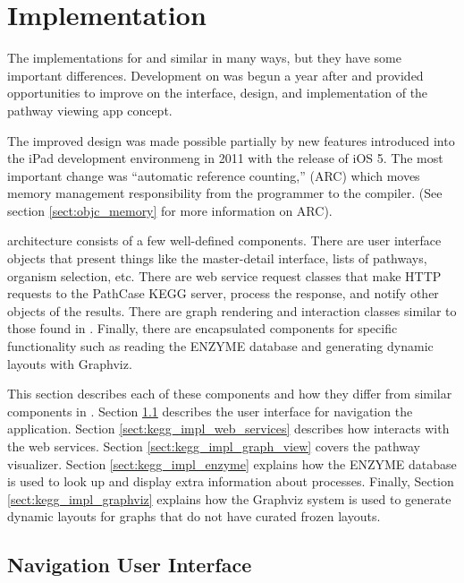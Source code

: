 \section{Implementation}
\label{sect:kegg_implementation}

The implementations for \mawapp and \keggapp similar in many ways, but they have
some important differences. Development on \keggapp was begun a year after
\mawapp and provided opportunities to improve on the interface, design, and
implementation of the pathway viewing app concept.

The improved design was made possible partially by new features introduced into
the iPad development environmeng in 2011 with the release of iOS 5. The most
important change was ``automatic reference counting,'' (ARC) which moves memory
management responsibility from the programmer to the compiler. (See section
\ref{sect:objc_memory} for more information on ARC).

\keggappp architecture consists of a few well-defined components. There are user
interface objects that present things like the master-detail interface, lists of
pathways, organism selection, etc. There are web service request classes that
make HTTP requests to the PathCase KEGG server, process the response, and notify
other objects of the results. There are graph rendering and interaction classes
similar to those found in \mawapp. Finally, there are encapsulated components
for specific functionality such as reading the ENZYME database and generating
dynamic layouts with Graphviz.

This section describes each of these components and how they differ from similar
components in \mawapp. Section \ref{sect:kegg_impl_ui} describes the user
interface for navigation the application. Section
\ref{sect:kegg_impl_web_services} describes how \keggapp interacts with the
\pathcasekegg web services. Section \ref{sect:kegg_impl_graph_view} covers the
pathway visualizer. Section \ref{sect:kegg_impl_enzyme} explains how the ENZYME
database \cite{enzyme-database} is used to look up and display extra information
about processes. Finally, Section \ref{sect:kegg_impl_graphviz} explains how the
Graphviz system \cite{graphviz} is used to generate dynamic layouts for graphs
that do not have curated frozen layouts.

\subsection{Navigation User Interface}
\label{sect:kegg_impl_ui}

